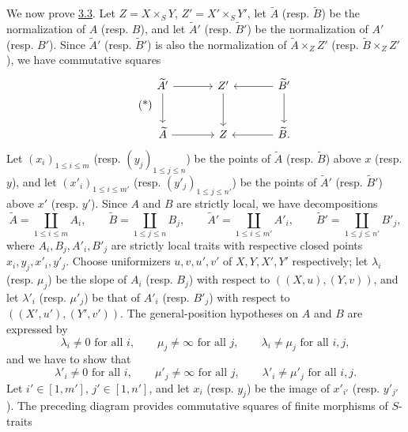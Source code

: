 \documentclass[11pt]{article}
\begin{document}
We now prove \hyperref[sga5:IIIB:lemma:3.3]{3.3}. Let $Z=X\times_SY$, $Z'=X'\times_SY'$, let $\widetilde A$ (resp. $\widetilde B$) be the normalization of $A$ (resp. $B$), and let $\widetilde A'$ (resp. $\widetilde B'$) be the normalization of $A'$ (resp. $B'$). Since $\widetilde A'$ (resp. $\widetilde B'$) is also the normalization of $\widetilde A\times_ZZ'$ (resp. $\widetilde B\times_ZZ'$), we have commutative squares
\begin{equation}\tag{*}\label{sga5:IIIB:equation:unnumbered:3}
\begin{tikzcd}[column sep=large,row sep=large]
\widetilde A' \arrow[r] \arrow[d] & Z' \arrow[d] & \widetilde B' \arrow[l] \arrow[d]\\
\widetilde A \arrow[r] & Z & \widetilde B . \arrow[l]
\end{tikzcd}
\end{equation}
Let $(x_i)_{1\le i\le m}$ (resp. $(y_j)_{1\le j\le n}$) be the points of $\widetilde A$ (resp. $\widetilde B$) above $x$ (resp. $y$), and let $(x'_i)_{1\le i\le m'}$ (resp. $(y'_j)_{1\le j\le n'}$) be the points of $\widetilde A'$ (resp. $\widetilde B'$) above $x'$ (resp. $y'$). Since $A$ and $B$ are strictly local, we have decompositions
\[
\widetilde A=\coprod_{1\le i\le m}A_i,\qquad
\widetilde B=\coprod_{1\le j\le n}B_j,\qquad
\widetilde A'=\coprod_{1\le i\le m'}A'_i,\qquad
\widetilde B'=\coprod_{1\le j\le n'}B'_j,
\]
where $A_i,B_j,A'_i,B'_j$ are strictly local traits with respective closed points $x_i,y_j,x'_i,y'_j$. Choose uniformizers $u,v,u',v'$ of $X,Y,X',Y'$ respectively; let $\lambda_i$ (resp. $\mu_j$) be the slope of $A_i$ (resp. $B_j$) with respect to $((X,u),(Y,v))$, and let $\lambda'_i$ (resp. $\mu'_j$) be that of $A'_i$ (resp. $B'_j$) with respect to $((X',u'),(Y',v'))$. The general-position hypotheses on $A$ and $B$ are expressed by
\begin{equation}
\lambda_i\ne0\text{ for all }i,\qquad
\mu_j\ne\infty\text{ for all }j,\qquad
\lambda_i\ne\mu_j\text{ for all }i,j,
\tag{1}\label{sga5:IIIB:equation:1:2}
\end{equation}
and we have to show that
\begin{equation}
\lambda'_i\ne0\text{ for all }i,\qquad
\mu'_j\ne\infty\text{ for all }j,\qquad
\lambda'_i\ne\mu'_j\text{ for all }i,j.
\tag{2}\label{sga5:IIIB:equation:2:2}
\end{equation}
Let $i'\in[1,m']$, $j'\in[1,n']$, and let $x_i$ (resp. $y_j$) be the image of $x'_{i'}$ (resp. $y'_{j'}$). The preceding diagram provides commutative squares of finite morphisms of $S$-traits
\end{document}
